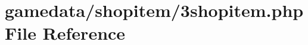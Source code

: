\hypertarget{3shopitem_8php}{\section{gamedata/shopitem/3shopitem.php File Reference}
\label{3shopitem_8php}
}
